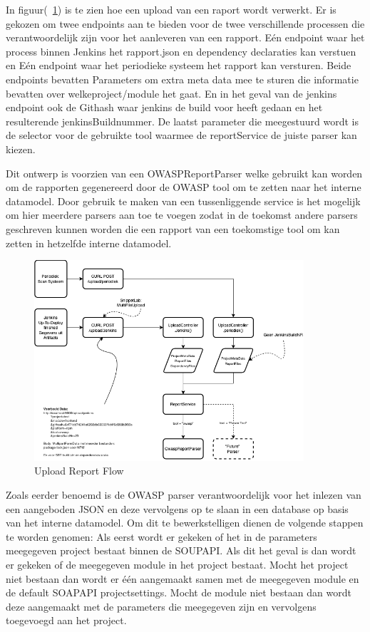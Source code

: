 In figuur(~\ref{fig:UploadReportFlow}) is te zien hoe een upload van een raport wordt verwerkt. Er is gekozen om twee endpoints aan te bieden voor de twee verschillende processen die verantwoordelijk zijn voor het aanleveren van een rapport. Eén endpoint waar het process binnen Jenkins het rapport.json en dependency declaraties kan verstuen en Eén endpoint waar het periodieke systeem het rapport kan versturen.
Beide endpoints bevatten Parameters om extra meta data mee te sturen die informatie bevatten over welkeproject/module het gaat. En in het geval van de jenkins endpoint ook de Githash waar jenkins de build voor heeft gedaan en het resulterende jenkinsBuildnummer. De laatst parameter die meegestuurd wordt is de selector voor de gebruikte tool waarmee de reportService de juiste parser kan kiezen.

Dit ontwerp is voorzien van een OWASPReportParser welke gebruikt kan worden om de rapporten gegenereerd door de OWASP tool om te zetten naar het interne datamodel. Door gebruik te maken van een tussenliggende service is het mogelijk om hier meerdere parsers aan toe te voegen zodat in de toekomst andere parsers geschreven kunnen worden die een rapport van een toekomstige tool om kan zetten in hetzelfde interne datamodel.
\begin{figure}[H]
    \myfloatalign
    \includegraphics[width=10cm]{gfx/SOUPAPI-UploadAnalysis}
    \caption{Upload Report Flow}
    \label{fig:UploadReportFlow}
\end{figure}
Zoals eerder benoemd is de OWASP parser verantwoordelijk voor het inlezen van een aangeboden JSON en deze vervolgens op te slaan in een database op basis van het interne datamodel. Om dit te bewerkstelligen dienen de volgende stappen te worden genomen:
Als eerst wordt er gekeken of het in de parameters meegegeven project bestaat binnen de SOUPAPI. Als dit het geval is dan wordt er gekeken of de meegegeven module in het project bestaat. Mocht het project niet bestaan dan wordt er één aangemaakt samen met de meegegeven module en de default SOAPAPI projectsettings. Mocht de module niet bestaan dan wordt deze aangemaakt met de parameters die meegegeven zijn en vervolgens toegevoegd aan het project.
